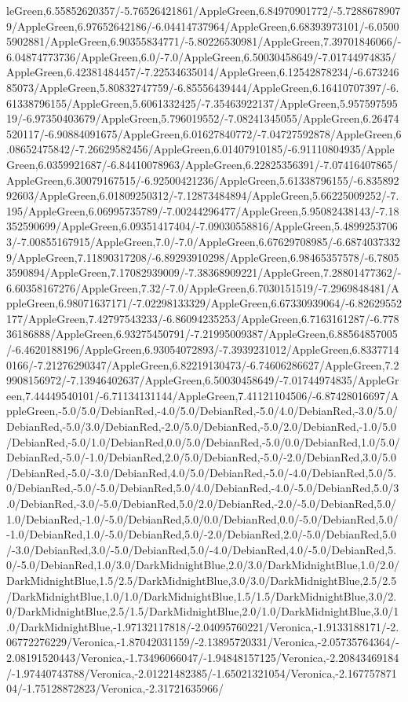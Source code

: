 {\begin{tikzternal}
leGreen,6.55852620357/-5.76526421861/AppleGreen,6.84970901772/-5.72886789079/AppleGreen,6.97652642186/-6.04414737964/AppleGreen,6.68393973101/-6.05005902881/AppleGreen,6.90355834771/-5.80226530981/AppleGreen,7.39701846066/-6.04874773736/AppleGreen,6.0/-7.0/AppleGreen,6.50030458649/-7.01744974835/AppleGreen,6.42381484457/-7.22534635014/AppleGreen,6.12542878234/-6.67324685073/AppleGreen,5.80832747759/-6.85556439444/AppleGreen,6.16410707397/-6.61338796155/AppleGreen,5.6061332425/-7.35463922137/AppleGreen,5.95759759519/-6.97350403679/AppleGreen,5.796019552/-7.08241345055/AppleGreen,6.26474520117/-6.90884091675/AppleGreen,6.01627840772/-7.04727592878/AppleGreen,6.08652475842/-7.26629582456/AppleGreen,6.01407910185/-6.91110804935/AppleGreen,6.0359921687/-6.84410078963/AppleGreen,6.22825356391/-7.07416407865/AppleGreen,6.30079167515/-6.92500421236/AppleGreen,5.61338796155/-6.83589292603/AppleGreen,6.01809250312/-7.12873484894/AppleGreen,5.66225009252/-7.195/AppleGreen,6.06995735789/-7.00244296477/AppleGreen,5.95082438143/-7.18352590699/AppleGreen,6.09351417404/-7.09030558816/AppleGreen,5.48992537063/-7.00855167915/AppleGreen,7.0/-7.0/AppleGreen,6.67629708985/-6.68740373329/AppleGreen,7.11890317208/-6.89293910298/AppleGreen,6.98465357578/-6.78053590894/AppleGreen,7.17082939009/-7.38368909221/AppleGreen,7.28801477362/-6.60358167276/AppleGreen,7.32/-7.0/AppleGreen,6.7030151519/-7.2969848481/AppleGreen,6.98071637171/-7.02298133329/AppleGreen,6.67330939064/-6.82629552177/AppleGreen,7.42797543233/-6.86094235253/AppleGreen,6.7163161287/-6.77836186888/AppleGreen,6.93275450791/-7.21995009387/AppleGreen,6.88564857005/-6.4620188196/AppleGreen,6.93054072893/-7.3939231012/AppleGreen,6.83377140166/-7.21276290347/AppleGreen,6.82219130473/-6.74606286627/AppleGreen,7.29908156972/-7.13946402637/AppleGreen,6.50030458649/-7.01744974835/AppleGreen,7.44449540101/-6.71134131144/AppleGreen,7.41121104506/-6.87428016697/AppleGreen,-5.0/5.0/DebianRed,-4.0/5.0/DebianRed,-5.0/4.0/DebianRed,-3.0/5.0/DebianRed,-5.0/3.0/DebianRed,-2.0/5.0/DebianRed,-5.0/2.0/DebianRed,-1.0/5.0/DebianRed,-5.0/1.0/DebianRed,0.0/5.0/DebianRed,-5.0/0.0/DebianRed,1.0/5.0/DebianRed,-5.0/-1.0/DebianRed,2.0/5.0/DebianRed,-5.0/-2.0/DebianRed,3.0/5.0/DebianRed,-5.0/-3.0/DebianRed,4.0/5.0/DebianRed,-5.0/-4.0/DebianRed,5.0/5.0/DebianRed,-5.0/-5.0/DebianRed,5.0/4.0/DebianRed,-4.0/-5.0/DebianRed,5.0/3.0/DebianRed,-3.0/-5.0/DebianRed,5.0/2.0/DebianRed,-2.0/-5.0/DebianRed,5.0/1.0/DebianRed,-1.0/-5.0/DebianRed,5.0/0.0/DebianRed,0.0/-5.0/DebianRed,5.0/-1.0/DebianRed,1.0/-5.0/DebianRed,5.0/-2.0/DebianRed,2.0/-5.0/DebianRed,5.0/-3.0/DebianRed,3.0/-5.0/DebianRed,5.0/-4.0/DebianRed,4.0/-5.0/DebianRed,5.0/-5.0/DebianRed,1.0/3.0/DarkMidnightBlue,2.0/3.0/DarkMidnightBlue,1.0/2.0/DarkMidnightBlue,1.5/2.5/DarkMidnightBlue,3.0/3.0/DarkMidnightBlue,2.5/2.5/DarkMidnightBlue,1.0/1.0/DarkMidnightBlue,1.5/1.5/DarkMidnightBlue,3.0/2.0/DarkMidnightBlue,2.5/1.5/DarkMidnightBlue,2.0/1.0/DarkMidnightBlue,3.0/1.0/DarkMidnightBlue,-1.97132117818/-2.04095760221/Veronica,-1.9133188171/-2.06772276229/Veronica,-1.87042031159/-2.13895720331/Veronica,-2.05735764364/-2.08191520443/Veronica,-1.73496066047/-1.94848157125/Veronica,-2.20843469184/-1.97440743788/Veronica,-2.01221482385/-1.65021321054/Veronica,-2.16775787104/-1.75128872823/Veronica,-2.31721635966/
\end{tikzternal}}
